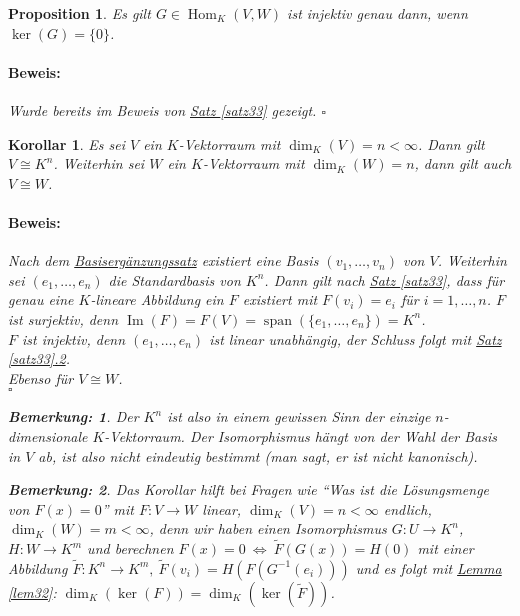 \documentclass{report}
\DeclareMathOperator{\Span}{span}
\DeclareMathOperator{\Hom}{Hom}
\DeclareMathOperator{\Ima}{Im}
\theoremstyle{customrem}
\newtheorem*{bem}{Bemerkung:}
\theoremstyle{customdef}
\newtheorem{proposition}[definition]{Proposition}
\newtheorem{korrolar}[definition]{Korollar}
\renewenvironment{proof}{\vspace{-.75cm}\paragraph{Beweis: }}{\vspace{-.5cm}\hfill$\square$}
\begin{document}
	\begin{proposition}
		Es gilt $G\in\Hom_K(V, W)$ ist injektiv genau dann, wenn $\ker(G)=\{0\}$.\\
		\begin{proof}
			Wurde bereits im Beweis von \hyperref[satz33]{Satz \ref{satz33}} gezeigt. 
		\end{proof}
	\end{proposition}
	\vspace{.25cm}
	\begin{korrolar}
		Es sei $V$ ein $K$-Vektorraum mit $\dim_K(V)=n<\infty$. Dann gilt $V\cong K^n$. Weiterhin sei $W$ ein $K$-Vektorraum mit $\dim_K(W)=n$, dann gilt auch $V\cong W$.\\
		
		\begin{proof}
			Nach dem \hyperref[satz218]{Basisergänzungssatz} existiert eine Basis $(v_1,\ldots, v_n)$ von $V$. Weiterhin sei $(e_1, \ldots, e_n)$ die Standardbasis von $K^n$. Dann gilt nach \hyperref[satz33]{Satz \ref{satz33}}, dass für genau eine $K$-lineare Abbildung ein $F$ existiert mit $F(v_i)=e_i$ für $i=1, \ldots, n$. $F$ ist surjektiv, denn $\Ima(F)=F(V)=\Span(\{e_1, \ldots, e_n\})=K^n$. \\
			$F$ ist injektiv, denn $(e_1, \ldots, e_n)$ ist linear unabhängig, der Schluss folgt mit \hyperref[satz33]{Satz \ref{satz33}.2}.\\
			\noindent Ebenso für $V\cong W$.\\
		\end{proof}
		\vspace{.5cm}
		\begin{bem}
			Der $K^n$ ist also in einem gewissen Sinn der einzige $n$-dimensionale $K$-Vektorraum. Der Isomorphismus hängt von der Wahl der Basis in $V$ ab, ist also nicht eindeutig bestimmt (man sagt, er ist nicht kanonisch).\\
		\end{bem}
		\begin{bem}
			Das Korollar hilft bei Fragen wie "`Was ist die Lösungsmenge von $F(x)=0$"' mit $F:V\to W$ linear, $\dim_K(V) = n<\infty$ endlich, $\dim_K(W) = m<\infty$, denn wir haben einen Isomorphismus $G:U\to K^n$, $H:W\to K^m$ und berechnen $F(x)=0\ \Leftrightarrow\ \tilde{F}(G(x)) = H(0)$ mit einer Abbildung $\tilde{F}:K^n\to K^m,\ \tilde{F}(v_i) = H(F(G^{-1}(e_i)))$ und es folgt mit \hyperref[lem32]{Lemma \ref{lem32}}: $\dim_K(\ker(F)) = \dim_K(\ker(\tilde{F}))$.\\
		\end{bem}
	\end{korrolar}
	
\end{document}
